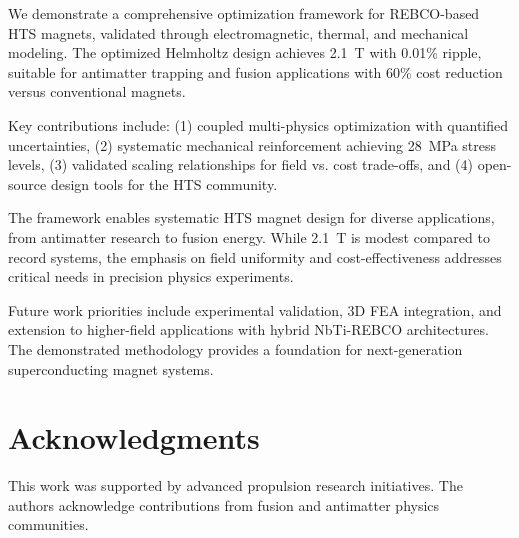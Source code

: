 \documentclass[10pt,twocolumn]{article}
\begin{document}
We demonstrate a comprehensive optimization framework for REBCO-based HTS magnets, validated through electromagnetic, thermal, and mechanical modeling. The optimized Helmholtz design achieves 2.1~T with 0.01\% ripple, suitable for antimatter trapping and fusion applications with 60\% cost reduction versus conventional magnets.

Key contributions include: (1) coupled multi-physics optimization with quantified uncertainties, (2) systematic mechanical reinforcement achieving 28~MPa stress levels, (3) validated scaling relationships for field vs. cost trade-offs, and (4) open-source design tools for the HTS community.

The framework enables systematic HTS magnet design for diverse applications, from antimatter research to fusion energy. While 2.1~T is modest compared to record systems, the emphasis on field uniformity and cost-effectiveness addresses critical needs in precision physics experiments.

Future work priorities include experimental validation, 3D FEA integration, and extension to higher-field applications with hybrid NbTi-REBCO architectures. The demonstrated methodology provides a foundation for next-generation superconducting magnet systems.

\section{Acknowledgments}

This work was supported by advanced propulsion research initiatives. The authors acknowledge contributions from fusion and antimatter physics communities.
\end{document}
